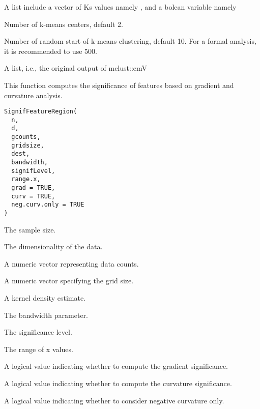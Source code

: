 \documentclass[a4paper]{book}
\begin{document}
%
\begin{Arguments}
\begin{ldescription}
\item[\code{v}] A list include a vector of Ks values namely ,
and a bolean variable namely 

\item[\code{k.centers}] Number of k-means centers, default 2.

\item[\code{k.nstart}] Number of random start of k-means clustering, default 10.
For a formal analysis, it is recommended to use 500.
\end{ldescription}
\end{Arguments}
%
\begin{Value}
A list, i.e., the original output of mclust::emV
\end{Value}
%
\begin{Description}\relax
This function computes the significance of features based on gradient and curvature analysis.
\end{Description}
%
\begin{Usage}
\begin{verbatim}
SignifFeatureRegion(
  n,
  d,
  gcounts,
  gridsize,
  dest,
  bandwidth,
  signifLevel,
  range.x,
  grad = TRUE,
  curv = TRUE,
  neg.curv.only = TRUE
)
\end{verbatim}
\end{Usage}
%
\begin{Arguments}
\begin{ldescription}
\item[\code{n}] The sample size.

\item[\code{d}] The dimensionality of the data.

\item[\code{gcounts}] A numeric vector representing data counts.

\item[\code{gridsize}] A numeric vector specifying the grid size.

\item[\code{dest}] A kernel density estimate.

\item[\code{bandwidth}] The bandwidth parameter.

\item[\code{signifLevel}] The significance level.

\item[\code{range.x}] The range of x values.

\item[\code{grad}] A logical value indicating whether to compute the gradient significance.

\item[\code{curv}] A logical value indicating whether to compute the curvature significance.

\item[\code{neg.curv.only}] A logical value indicating whether to consider negative curvature only.
\end{ldescription}
\end{Arguments}
\end{document}
